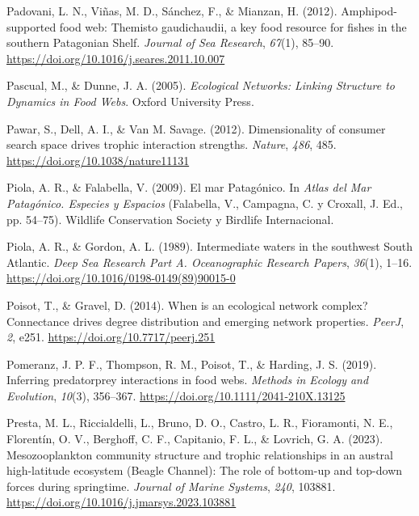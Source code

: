 \documentclass[preprint, 3p,
authoryear]{elsarticle} %
\newlength{\cslhangindent}
\newlength{\cslentryspacingunit} %
\newenvironment{CSLReferences}[2] %
 {%
  \setlength{\parindent}{0pt}
  \ifodd #1
  \let\oldpar\par
  \def\par{\hangindent=\cslhangindent\oldpar}
  \fi
  \setlength{\parskip}{#2\cslentryspacingunit}
 }%
 {}
\begin{document}
\begin{CSLReferences}{1}{0}
\leavevmode{}%
Padovani, L. N., Viñas, M. D., Sánchez, F., \& Mianzan, H. (2012).
Amphipod-supported food web: {Themisto} gaudichaudii, a key food
resource for fishes in the southern {Patagonian Shelf}. \emph{Journal of
Sea Research}, \emph{67}(1), 85--90.
\url{https://doi.org/10.1016/j.seares.2011.10.007}

\leavevmode{}%
Pascual, M., \& Dunne, J. A. (2005). \emph{Ecological {Networks}:
{Linking Structure} to {Dynamics} in {Food Webs}}. {Oxford University
Press}.

\leavevmode{}%
Pawar, S., Dell, A. I., \& Van M. Savage. (2012). Dimensionality of
consumer search space drives trophic interaction strengths.
\emph{Nature}, \emph{486}, 485.
\url{https://doi.org/10.1038/nature11131}

\leavevmode{}%
Piola, A. R., \& Falabella, V. (2009). {El mar Patagónico}. In
\emph{{Atlas del Mar Patagónico. Especies y Espacios}} (Falabella, V.,
Campagna, C. y Croxall, J. Ed., pp. 54--75). {Wildlife Conservation
Society y Birdlife Internacional}.

\leavevmode{}%
Piola, A. R., \& Gordon, A. L. (1989). Intermediate waters in the
southwest {South Atlantic}. \emph{Deep Sea Research Part A.
Oceanographic Research Papers}, \emph{36}(1), 1--16.
\url{https://doi.org/10.1016/0198-0149(89)90015-0}

\leavevmode{}%
Poisot, T., \& Gravel, D. (2014). When is an ecological network complex?
{Connectance} drives degree distribution and emerging network
properties. \emph{PeerJ}, \emph{2}, e251.
\url{https://doi.org/10.7717/peerj.251}

\leavevmode{}%
Pomeranz, J. P. F., Thompson, R. M., Poisot, T., \& Harding, J. S.
(2019). Inferring predator\textendash prey interactions in food webs.
\emph{Methods in Ecology and Evolution}, \emph{10}(3), 356--367.
\url{https://doi.org/10.1111/2041-210X.13125}

\leavevmode{}%
Presta, M. L., Riccialdelli, L., Bruno, D. O., Castro, L. R.,
Fioramonti, N. E., Florentín, O. V., Berghoff, C. F., Capitanio, F. L.,
\& Lovrich, G. A. (2023). Mesozooplankton community structure and
trophic relationships in an austral high-latitude ecosystem ({Beagle
Channel}): {The} role of bottom-up and top-down forces during
springtime. \emph{Journal of Marine Systems}, \emph{240}, 103881.
\url{https://doi.org/10.1016/j.jmarsys.2023.103881}


\end{CSLReferences}
\end{document}
